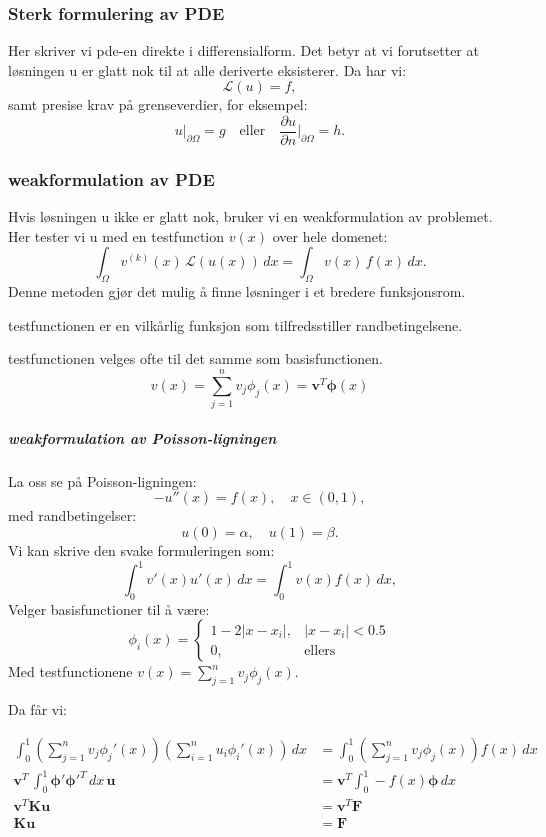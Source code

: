 \subsubsection{Sterk formulering av PDE}
Her skriver vi \gls{pde}-en direkte i differensialform. Det betyr at vi forutsetter at løsningen u er glatt nok til at alle deriverte eksisterer. Da har vi:
\[
  \mathcal{L}(u) = f,
\]
samt presise krav på grenseverdier, for eksempel:
\[
  u|_{\partial \Omega} = g \quad \text{eller} \quad \frac{\partial u}{\partial n}\bigg|_{\partial \Omega} = h.
\]

\subsubsection{\gls{weakformulation} av PDE}
Hvis løsningen u ikke er glatt nok, bruker vi en \gls{weakformulation} av problemet.
Her tester vi u med en \gls{testfunction} \(v(x)\) over hele domenet:
\[
  \int_\Omega v^{(k)}(x) \, \mathcal{L}(u(x)) \, dx = \int_\Omega v(x) \, f(x) \, dx.
\]
Denne metoden gjør det mulig å finne løsninger i et bredere funksjonsrom.

\gls{testfunction}en er en vilkårlig funksjon som tilfredsstiller randbetingelsene.

\gls{testfunction}en velges ofte til det samme som \gls{basisfunction}en.
\[
  v(x) = \sum_{j=1}^n v_j \phi_j(x) = \symbf{v}^T \symbf{\phi}(x)
\]

\subparagraph{\gls{weakformulation} av Poisson-ligningen}
La oss se på Poisson-ligningen:
\[
  -u''(x) = f(x), \quad x \in (0,1),
\]
med randbetingelser:
\[
  u(0) = \alpha, \quad u(1) = \beta.
\]
Vi kan skrive den svake formuleringen som:
\[
  \int_0^1 v'(x) u'(x) \, dx = \int_0^1 v(x) f(x) \, dx,
\]
Velger \gls{basisfunction}er til å være:
\[
  \phi_i(x) = \begin{cases}
    1 - 2|x - x_i|, & |x - x_i| < 0.5 \\
    0,              & \text{ellers}
  \end{cases}
\]
Med \gls{testfunction}ene \(v(x) = \sum_{j=1}^n v_j \phi_j(x)\).

Da får vi:

\begin{align*}
  \int_0^1 \left( \sum_{j=1}^n v_j \phi_j'(x) \right)
  \left( \sum_{i=1}^n u_i \phi_i'(x) \right) \, dx
                      & =
  \int_0^1 \left( \sum_{j=1}^n v_j \phi_j(x) \right) f(x) \, dx \\
  \symbf{v}^T \, \int_0^1 \symbf{\phi}' \symbf{\phi}'^T \, dx \, \symbf{u}
                      & =
  \symbf{v}^T \int_0^1 - f(x) \symbf{\phi}  \, dx               \\
  \symbf{v}^T \symbf{K} \symbf{u}
                      & =
  \symbf{v}^T \symbf{F}                                         \\
  \symbf{K} \symbf{u} & = \symbf{F}
\end{align*}


